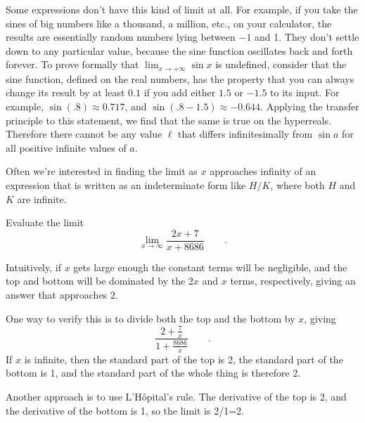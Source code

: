 Some expressions don't have this kind of limit at all. For example, if you take the
sines of big numbers like a thousand, a million, etc., on your calculator, the results
are essentially random numbers lying between $-1$ and 1. They don't settle down to any
particular value, because the sine function oscillates back and forth forever.
To prove formally that $\lim_{x\rightarrow +\infty} \sin x$ is undefined, consider that the sine function, defined on the real
numbers, has the property that you can always change its result by at least $0.1$ if you
add either $1.5$ or $-1.5$ to its input. For example, $\sin(.8)\approx 0.717$, and $\sin(.8-1.5)\approx-0.644$.
Applying the transfer principle to this statement, we find that the same is true
on the hyperreals. Therefore there cannot be any value $\ell$ that differs infinitesimally
from $\sin a$ for all positive infinite values of $a$.

Often we're interested in finding the limit as $x$ approaches infinity of an expression
that is written as an indeterminate form like $H/K$, where both  $H$ and $K$ are infinite.

\begin{eg}
\egquestion Evaluate the limit
\begin{equation*}
  \lim_{x\rightarrow \infty} \frac{2x+7}{x+8686} \qquad .
\end{equation*}

\egquestion Intuitively, if $x$ gets large enough the constant terms will be negligible, and
the top and bottom will be dominated by the $2x$ and $x$ terms, respectively, giving an
answer that approaches 2.

One way to verify this is to divide both the top and the bottom by $x$, giving
\begin{equation*}
  \frac{2+\frac{7}{x}}{1+\frac{8686}{x}} \qquad .
\end{equation*}
If $x$ is infinite, then the standard part of the top is 2, the standard part of the
bottom is 1, and the standard part of the whole thing is therefore 2.

Another approach is to use L'H\^{o}pital's rule. The derivative
of the top is 2, and the derivative of the bottom is 1, so the limit is 2/1=2.
\end{eg}

